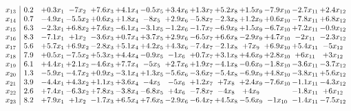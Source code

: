 \documentclass[10pt]{article}
\begin{document}
\[\begin{array}{c| c c@{\hskip 2pt} c@{\hskip 2pt} c@{\hskip 2pt} c@{\hskip 2pt} c@{\hskip 2pt} c@{\hskip 2pt} c@{\hskip 2pt} c@{\hskip 2pt} c@{\hskip 2pt} c@{\hskip 2pt} c@{\hskip 2pt} c@{\hskip 2pt} }
 x_{13}   &  0.2 & + 0.3 x_{1} & -7  x_{2} & + 7.6 x_{3} & + 4.1 x_{4} & -0.5 x_{5} & + 3.4 x_{6} & + 1.3 x_{7} & + 5.2 x_{8} & + 1.5 x_{9} & -7.9 x_{10} & -2.7 x_{11} & + 2.4 x_{12}\\
 x_{14}   &  0.7 & -4.9 x_{1} & -5.5 x_{2} & + 0.6 x_{3} & + 1.8 x_{4} & -8  x_{5} & + 2.9 x_{6} & -5.8 x_{7} & -2.3 x_{8} & + 1.2 x_{9} & + 0.6 x_{10} & -7.8 x_{11} & + 6.8 x_{12}\\
 x_{15}   &  6.3 & -2.3 x_{1} & + 6.8 x_{2} & + 7.6 x_{3} & -6.1 x_{4} & -3.1 x_{5} & -1.2 x_{6} & -1.7 x_{7} & -6.9 x_{8} & + 1.5 x_{9} & -6.7 x_{10} & + 7.2 x_{11} & -0.9 x_{12}\\
 x_{16}   &  8.3 & -7.1 x_{1} & + 1  x_{2} & -3.6 x_{3} & + 0.7 x_{4} & + 3.7 x_{5} & + 2.9 x_{6} & -6.5 x_{7} & + 6.6 x_{8} & -2.9 x_{9} & + 4.7 x_{10} & -2  x_{11} & -2.3 x_{12}\\
 x_{17}   &  5.6 & + 5.7 x_{1} & + 6.9 x_{2} & -2.8 x_{3} & + 5.1 x_{4} & + 4.2 x_{5} & + 4.3 x_{6} & -7.4 x_{7} & -2.1 x_{8} & + 7  x_{9} & + 6.9 x_{10} & + 5.4 x_{11} & -5  x_{12}\\
 x_{18}   &  7.9 & + 0.5 x_{1} & -7.5 x_{2} & + 5.3 x_{3} & + 4.4 x_{4} & -0.9 x_{5} & -1  x_{6} & + 0.7 x_{7} & + 3.1 x_{8} & + 4.6 x_{9} & + 2.8 x_{10} & + 6  x_{11} & + 3  x_{12}\\
 x_{19}   &  6.1 & + 4.4 x_{1} & + 2.1 x_{2} & -4.6 x_{3} & + 7.7 x_{4} & -5  x_{5} & + 2.7 x_{6} & + 1.9 x_{7} & -4.1 x_{8} & -0.6 x_{9} & -1.8 x_{10} & -3.6 x_{11} & -3.7 x_{12}\\
 x_{20}   &  1.3 & -5.9 x_{1} & -4.7 x_{2} & + 0.9 x_{3} & -3.1 x_{4} & + 1.3 x_{5} & -5.6 x_{6} & -3.6 x_{7} & -5.4 x_{8} & -6.9 x_{9} & + 4.8 x_{10} & -3.8 x_{11} & + 5.6 x_{12}\\
 x_{21}   &  3.9 & -4.4 x_{1} & + 4.3 x_{2} & + 1.1 x_{3} & + 3.6 x_{4} & -4  x_{5} & -5  x_{6} & + 1.2 x_{7} & + 7  x_{8} & + 2.4 x_{9} & -7.6 x_{10} & -1.1 x_{11} & -4.3 x_{12}\\
 x_{22}   &  2.6 & + 7.4 x_{1} & -6.3 x_{2} & + 7.8 x_{3} & -3.8 x_{4} & -6.8 x_{5} & + 4  x_{6} & -7.8 x_{7} & -4  x_{8} & + 4  x_{9} &   & -1.8 x_{11} & + 6  x_{12}\\
 x_{23}   &  8.2 & + 7.9 x_{1} & + 1  x_{2} & -1.7 x_{3} & + 6.5 x_{4} & + 7.6 x_{5} & -2.9 x_{6} & -6.4 x_{7} & + 4.5 x_{8} & -5.6 x_{9} & -1  x_{10} & -1.4 x_{11} & -7.5 x_{12}\\

\end{array}\]
\end{document}
